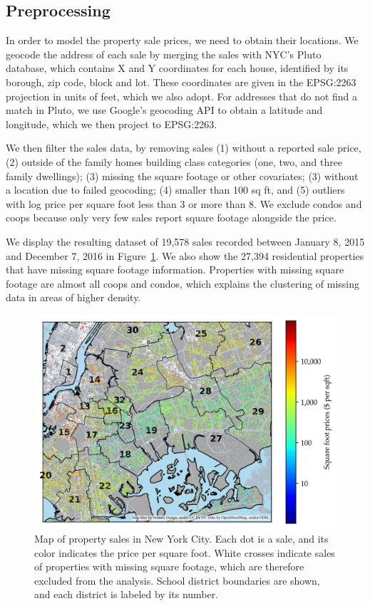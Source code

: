 \documentclass[letter,12pt]{article}
\begin{document}
\hypertarget{preprocessing}{%
\subsection{Preprocessing}\label{preprocessing}}

In order to model the property sale prices, we need to obtain their locations.
We geocode the address of each sale by merging the sales with NYC's Pluto database, which contains X and Y coordinates for each house, identified by its borough, zip code, block and lot.
These coordinates are given in the EPSG:2263 projection in units of feet, which we also adopt.
For addresses that do not find a match in Pluto, we use Google's geocoding API to obtain a latitude and longitude, which we then project to EPSG:2263.

We then filter the sales data, by removing sales (1) without a reported sale price, (2) outside of the family homes building class categories (one, two, and three family dwellings); (3) missing the square footage or other covariates; (3) without a location due to failed geocoding; (4) smaller than 100 sq ft, and (5) outliers with log price per square foot less than 3 or more than 8.
We exclude condos and coops because only very few sales report square footage alongside the price.

We display the resulting dataset of 19,578 sales recorded between January 8, 2015 and December 7, 2016 in Figure~\ref{fig:sales_map}.
We also show the 27,394 residential properties that have missing square footage information.
Properties with missing square footage are almost all coops and condos, which explains the clustering of missing data in areas of higher density.



\begin{figure}[tbp]
    \centering
    \includegraphics[width=\textwidth,height=0.4\textheight,keepaspectratio]{../NYC/NYC_plots/NYC_sales_4.png}
    \caption{\label{fig:sales_map}Map of property sales in New York City. Each dot is a sale, and its color indicates the price per square foot. White crosses indicate sales of properties with missing square footage, which are therefore excluded from the analysis. School district boundaries are shown, and each district is labeled by its number.}
\end{figure}
\end{document}

